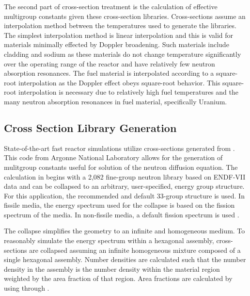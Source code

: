   The second part of cross-section treatment is the calculation of effective
  multigroup constants given these cross-section libraries. Cross-sections
  assume an interpolation method between the temperatures used to generate the
  libraries. The simplest interpolation method is linear interpolation and this
  is valid for materials minimally effected by Doppler broadening. Such 
  materials include cladding and sodium as these materials do not change
  temperature significantly over the operating range of the reactor and have
  relatively few neutron absorption resonances. The fuel material is
  interpolated according to a square-root interpolation as the Doppler effect
  obeys square-root behavior. This square-root interpolation is necessary due to
  relatively high fuel temperatures and the many neutron absorption resonances
  in fuel material, specifically Uranium.

  \subsection{Cross Section Library Generation}
    State-of-the-art fast reactor simulations utilize cross-sections generated
    from \mcc. This code from Argonne National Laboratory allows for the
    generation of mulitgroup constants useful for solution of the neutron
    diffusion equation. The calculation in \mcc begins with a 2,082 fine-group
    neutron library based on ENDF-VII data and can be collapsed to an
    arbitrary, user-specified, energy group structure. For this application, the
    recommended and default 33-group structure is used. In fissile media, the
    energy spectrum used for the collapse is based on the fission spectrum of
    the media. In non-fissile media, a default  fission spectrum
    is used \cite{mcc}.
    
    The collapse simplifies the geometry to an infinite and homogeneous medium.
    To reasonably simulate the energy spectrum within a hexagonal assembly,
    cross-sections are collapsed assuming an infinite homogeneous mixture 
    composed of a single hexagonal assembly. Number densities are calculated 
    such that the number density in the assembly is the number density within
    the material region weighted by the area fraction of that region. Area
    fractions are calculated by using  through 
    .
    
